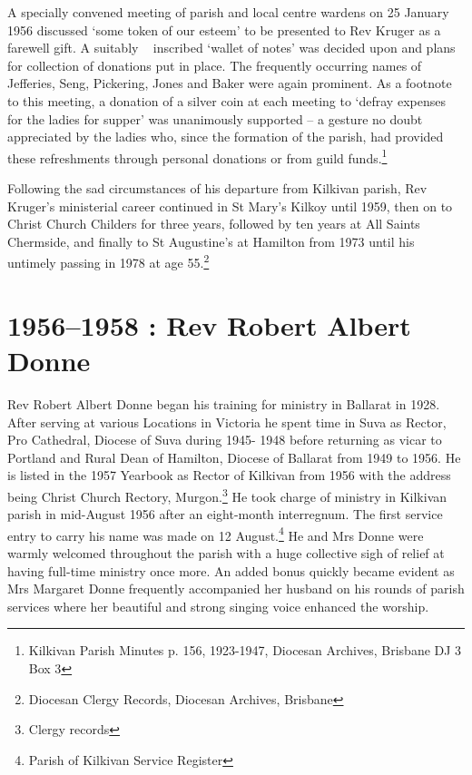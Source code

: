 A specially convened meeting of parish and local centre wardens on 25
January 1956 discussed `some token of our esteem' to be presented to Rev
Kruger as a farewell gift. A suitably ~ inscribed `wallet of notes' was
decided upon and plans for collection of donations put in place. The
frequently occurring names of Jefferies, Seng, Pickering, Jones and
Baker were again prominent. As a footnote to this meeting, a donation of
a silver coin at each meeting to `defray expenses for the ladies for
supper' was unanimously supported -- a gesture no doubt appreciated by
the ladies who, since the formation of the parish, had provided these
refreshments through personal donations or from guild funds.\footnote{Kilkivan
  Parish Minutes p. 156, 1923-1947, Diocesan Archives, Brisbane DJ 3 Box
  3}

Following the sad circumstances of his departure from Kilkivan parish,
Rev Kruger's ministerial career continued in St Mary's Kilkoy until
1959, then on to Christ Church Childers for three years, followed by ten
years at All Saints Chermside, and finally to St Augustine's at Hamilton
from 1973 until his untimely passing in 1978 at age 55.\footnote{Diocesan
  Clergy Records, Diocesan Archives, Brisbane}

\printendnotes
\setcounter{endnote}{0}
\chapter{1956--1958 : Rev Robert Albert
Donne}

Rev Robert Albert Donne began his training for ministry in Ballarat in
1928. After serving at various Locations in Victoria he spent time in
Suva as Rector, Pro Cathedral, Diocese of Suva during 1945- 1948 before
returning as vicar to Portland and Rural Dean of Hamilton, Diocese of
Ballarat from 1949 to 1956. He is listed in the 1957 Yearbook as Rector
of Kilkivan from 1956 with the address being Christ Church Rectory,
Murgon.\footnote{Clergy records} He took charge of ministry in Kilkivan
parish in mid-August 1956 after an eight-month interregnum. The first
service entry to carry his name was made on 12 August.\footnote{Parish
  of Kilkivan Service Register} He and Mrs Donne were warmly welcomed
throughout the parish with a huge collective sigh of relief at having
full-time ministry once more. An added bonus quickly became evident as
Mrs Margaret Donne frequently accompanied her husband on his rounds of
parish services where her beautiful and strong singing voice enhanced
the worship.

